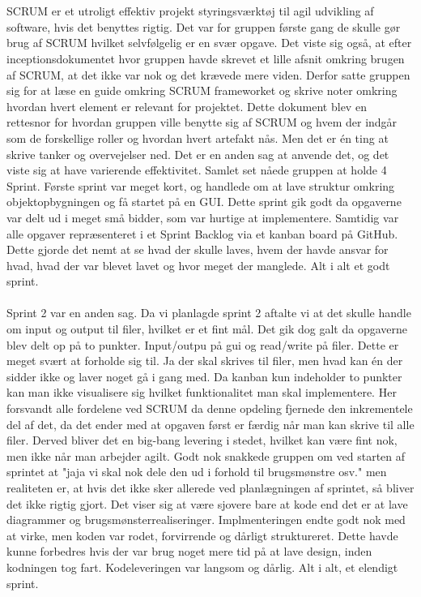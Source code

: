\\\\
SCRUM er et utroligt effektiv projekt styringsværktøj til agil udvikling af software, hvis det benyttes rigtig. Det var for gruppen første gang de skulle gør brug af SCRUM hvilket selvfølgelig er en svær opgave. Det viste sig også, at efter inceptionsdokumentet hvor gruppen havde skrevet et lille afsnit omkring brugen af SCRUM, at det ikke var nok og det krævede mere viden. Derfor satte gruppen sig for at læse en guide omkring SCRUM frameworket og skrive noter omkring hvordan hvert element er relevant for projektet. Dette dokument blev en rettesnor for hvordan gruppen ville benytte sig af SCRUM og hvem der indgår som de forskellige roller og hvordan hvert artefakt nås. 
Men det er én ting at skrive tanker og overvejelser ned. Det er en anden sag at anvende det, og det viste sig at have varierende effektivitet. Samlet set nåede gruppen at holde 4 Sprint. Første sprint var meget kort, og handlede om at lave struktur omkring objektopbygningen og få startet på en GUI. Dette sprint gik godt da opgaverne var delt ud i meget små bidder, som var hurtige at implementere. Samtidig var alle opgaver repræsenteret i et Sprint Backlog via et kanban board på GitHub. Dette gjorde det nemt at se hvad der skulle laves, hvem der havde ansvar for hvad, hvad der var blevet lavet og hvor meget der manglede. Alt i alt et godt sprint.\\\\
Sprint 2 var en anden sag. Da vi planlagde sprint 2 aftalte vi at det skulle handle om input og output til filer, hvilket er et fint mål. Det gik dog galt da opgaverne blev delt op på to punkter. Input/outpu på gui og read/write på filer. Dette er meget svært at forholde sig til. Ja der skal skrives til filer, men hvad kan én der sidder ikke og laver noget gå i gang med. Da kanban kun indeholder to punkter kan man ikke visualisere sig hvilket funktionalitet man skal implementere. Her forsvandt alle fordelene ved SCRUM da denne opdeling fjernede den inkrementele del af det, da det ender med at opgaven først er færdig når man kan skrive til alle filer. Derved bliver det en big-bang levering i stedet, hvilket kan være fint nok, men ikke når man arbejder agilt. Godt nok snakkede gruppen om ved starten af sprintet at "jaja vi skal nok dele den ud i forhold til brugsmønstre osv." men realiteten er, at hvis det ikke sker allerede ved planlægningen af sprintet, så bliver det ikke rigtig gjort. Det viser sig at være sjovere bare at kode end det er at lave diagrammer og brugsmønsterrealiseringer. Implmenteringen endte godt nok med at virke, men koden var rodet, forvirrende og dårligt struktureret. Dette havde kunne forbedres hvis der var brug noget mere tid på at lave design, inden kodningen tog fart. Kodeleveringen var langsom og dårlig. Alt i alt, et elendigt sprint.\\\\
